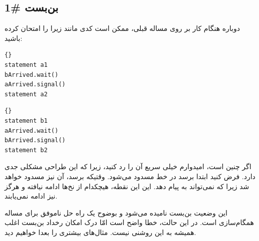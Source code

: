 \documentclass{book}
\begin{document}
\subsection {بن‌بست \#1}

      دوباره هنگام کار بر روی مساله قبلی، ممکن است کدی مانند زیرا را امتحان کرده باشید:

\begin{latin}
\begin{minipage}[t]{2in}
\begin{latin}
\begin{lstlisting}[title=\rl{نخ \lr{A}}]{}
statement a1
bArrived.wait()
aArrived.signal()
statement a2
\end{lstlisting}
\end{latin}
\end{minipage}
\hfill
\begin{minipage}[t]{2in}
\begin{latin}
\begin{lstlisting}[title=\rl{نخ \lr{B}}]{}
statement b1
aArrived.wait()
bArrived.signal()
statement b2
\end{lstlisting}
\end{latin}
\end{minipage}
\end{latin}

    اگر چنین است، امیدوارم خیلی سریع آن را رد کنید، زیرا که این طراحی مشکلی جدی دارد. فرض کنید ابتدا  برسد 
    در خط  مسدود می‌شود. وقتیکه   برسد، آن نیز مسدود خواهد شد زیرا که  نمی‌تواند به  
    پیام دهد. این این نقطه، هیچکدام از نخ‌ها ادامه نیافته و هرگز نیز ادامه نمی‌یابند. 

    این وضعیت بن‌بست نامیده می‌شود و بوضوح یک راه حل ناموفق برای مساله همگام‌سازی است. 
    در این حالت، خطا واضح است امّا درک امکان رخداد بن‌بست اغلب همیشه به این روشنی نیست. 
    مثال‌های بیشتری را بعدا خواهیم دید. 
\end{document}
